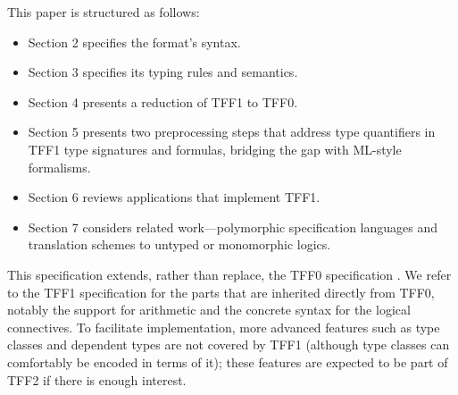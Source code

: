 This paper is structured as follows:
\begin{itemize}
\item Section 2 specifies the format's syntax.
\item Section 3 specifies its typing rules and semantics.
\item Section 4 presents a reduction of TFF1 to TFF0.
\item Section 5 presents two preprocessing steps that address type quantifiers
in TFF1 type signatures and formulas, bridging the gap with ML-style
formalisms. %
\item Section 6 reviews applications that implement TFF1.
\item Section 7 considers related work---polymorphic specification languages
and translation schemes to untyped or monomorphic logics.
\end{itemize}

This specification extends, rather than replace, the TFF0 specification
\cite{TFF0}. We refer to the TFF1 specification for the parts that are inherited
directly from TFF0, notably the support for arithmetic and the concrete syntax
for the logical connectives.
%
To facilitate implementation, more advanced features such as type classes and
dependent types are not covered by TFF1 (although type classes can comfortably
be encoded in terms of it); these features are expected to be part of TFF2 if
there is enough interest.
